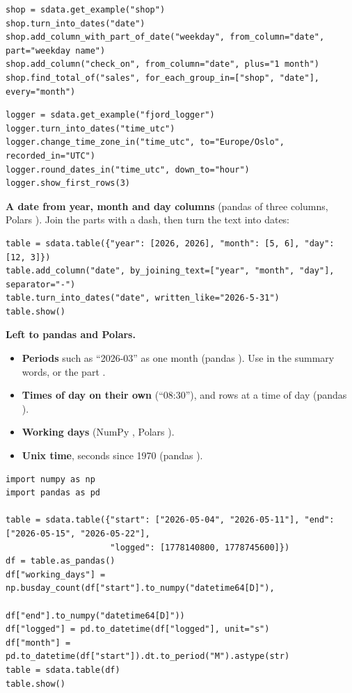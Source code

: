 \begin{lstlisting}[style=py]
shop = sdata.get_example("shop")
shop.turn_into_dates("date")
shop.add_column_with_part_of_date("weekday", from_column="date", part="weekday name")
shop.add_column("check_on", from_column="date", plus="1 month")
shop.find_total_of("sales", for_each_group_in=["shop", "date"], every="month")
\end{lstlisting}

\begin{lstlisting}[style=py]
logger = sdata.get_example("fjord_logger")
logger.turn_into_dates("time_utc")
logger.change_time_zone_in("time_utc", to="Europe/Oslo", recorded_in="UTC")
logger.round_dates_in("time_utc", down_to="hour")
logger.show_first_rows(3)
\end{lstlisting}

\textbf{A date from year, month and day columns} (pandas  of three columns, Polars
). Join the parts with a dash, then turn the text into dates:

\begin{lstlisting}[style=py]
table = sdata.table({"year": [2026, 2026], "month": [5, 6], "day": [12, 3]})
table.add_column("date", by_joining_text=["year", "month", "day"], separator="-")
table.turn_into_dates("date", written_like="2026-5-31")
table.show()
\end{lstlisting}

\textbf{Left to pandas and Polars.}
\begin{itemize}
  \item \textbf{Periods} such as ``2026-03'' as one month (pandas ). Use
     in the summary words, or the part .
  \item \textbf{Times of day on their own} (``08:30''), and rows at a time of day (pandas
    ).
  \item \textbf{Working days} (NumPy , Polars ).
  \item \textbf{Unix time}, seconds since 1970 (pandas ).
\end{itemize}

\begin{lstlisting}[style=py]
import numpy as np
import pandas as pd

table = sdata.table({"start": ["2026-05-04", "2026-05-11"], "end": ["2026-05-15", "2026-05-22"],
                     "logged": [1778140800, 1778745600]})
df = table.as_pandas()
df["working_days"] = np.busday_count(df["start"].to_numpy("datetime64[D]"),
                                     df["end"].to_numpy("datetime64[D]"))
df["logged"] = pd.to_datetime(df["logged"], unit="s")
df["month"] = pd.to_datetime(df["start"]).dt.to_period("M").astype(str)
table = sdata.table(df)
table.show()
\end{lstlisting}

